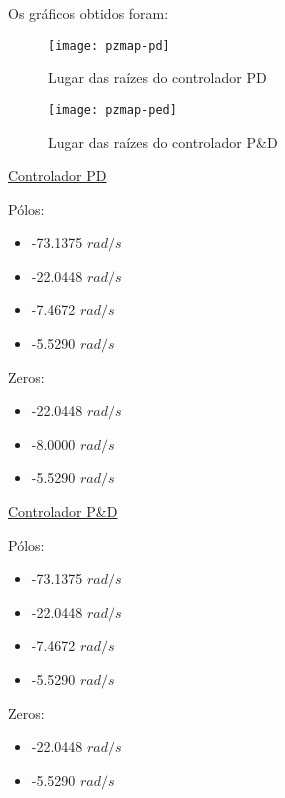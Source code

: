\documentclass[a4paper,11pt]{article}
\begin{document}
\pagebreak

Os gráficos obtidos foram:

\begin{figure}[H]
\centering
\texttt{[image: pzmap-pd]}
\caption{Lugar das raízes do controlador PD}
\end{figure}

\begin{figure}[H]
\centering
\texttt{[image: pzmap-ped]}
\caption{Lugar das raízes do controlador P\&D}
\end{figure}

\underline{Controlador PD}

\begin{multicols}{2}
    Pólos:
    \begin{itemize}
        \item -73.1375 $rad/s$
        \item -22.0448 $rad/s$
        \item -7.4672 $rad/s$
        \item -5.5290 $rad/s$
    \end{itemize}
\columnbreak
    Zeros:
    \begin{itemize}
        \item -22.0448 $rad/s$
        \item -8.0000 $rad/s$
        \item -5.5290 $rad/s$
    \end{itemize}
\end{multicols}

\underline{Controlador P\&D}

\begin{multicols}{2}
    Pólos:
    \begin{itemize}
        \item -73.1375 $rad/s$
        \item -22.0448 $rad/s$
        \item -7.4672 $rad/s$
        \item -5.5290 $rad/s$
    \end{itemize}
\columnbreak
    Zeros:
    \begin{itemize}
        \item -22.0448 $rad/s$
        \item -5.5290 $rad/s$
    \end{itemize}
\end{multicols}
\end{document}
